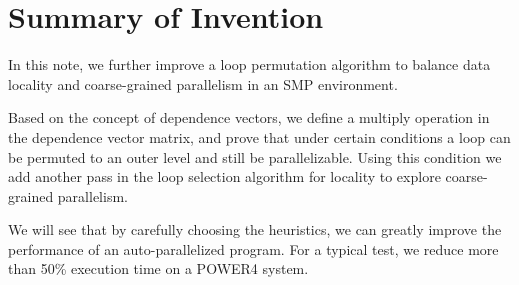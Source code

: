 \section{Summary of Invention} 

In this note, we further improve a loop permutation algorithm to
balance data locality and coarse-grained parallelism in an SMP
environment.

Based on the concept of dependence vectors, we define a multiply
operation in the dependence vector matrix, and prove that under
certain conditions a loop can be permuted to an outer level and still
be parallelizable. Using this condition we add another pass in the
loop selection algorithm for locality to explore coarse-grained
parallelism.

We will see that by carefully choosing the heuristics, we can greatly
improve the performance of an auto-parallelized program. For a typical
test, we reduce more than 50\% execution time on a POWER4 system.


